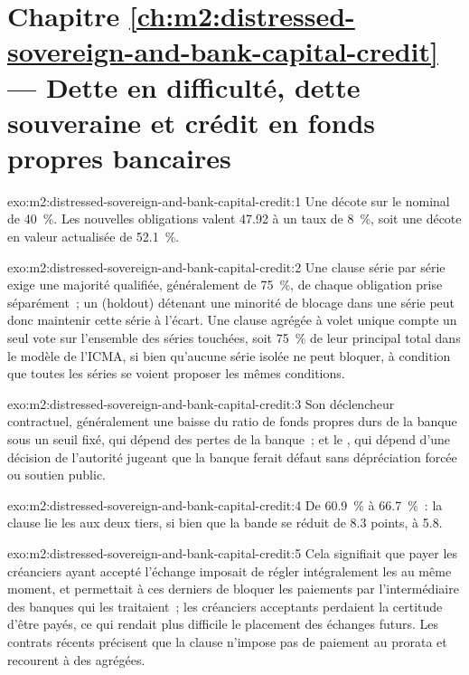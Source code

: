 \section*{Chapitre \ref{ch:m2:distressed-sovereign-and-bank-capital-credit} --- Dette en difficulté, dette souveraine et crédit en fonds propres bancaires}

\begin{solution}{exo:m2:distressed-sovereign-and-bank-capital-credit:1}
Une décote sur le nominal de 40~\%. Les nouvelles obligations valent 47.92 à un taux de 8~\%, soit une
décote en valeur actualisée de 52.1~\%.
\end{solution}

\begin{solution}{exo:m2:distressed-sovereign-and-bank-capital-credit:2}
Une clause série par série exige une majorité qualifiée, généralement de 75~\%, de chaque
obligation prise séparément~; un  (holdout) détenant une minorité de blocage dans une série peut donc maintenir cette série à l'écart.
Une clause agrégée à volet unique compte un seul vote sur l'ensemble des séries touchées, soit 75~\% de
leur principal total dans le modèle de l'ICMA, si bien qu'aucune série isolée ne peut bloquer, à condition que
toutes les séries se voient proposer les mêmes conditions.
\end{solution}

\begin{solution}{exo:m2:distressed-sovereign-and-bank-capital-credit:3}
Son déclencheur contractuel, généralement une baisse du ratio de fonds propres durs de la banque
sous un seuil fixé, qui dépend des pertes de la banque~; et le , qui dépend
d'une décision de l'autorité jugeant que la banque ferait défaut sans dépréciation forcée ou
soutien public.
\end{solution}

\begin{solution}{exo:m2:distressed-sovereign-and-bank-capital-credit:4}
De 60.9~\% à 66.7~\%~: la clause lie les  aux deux tiers, si bien que la bande
se réduit de 8.3 points, à 5.8.
\end{solution}

\begin{solution}{exo:m2:distressed-sovereign-and-bank-capital-credit:5}
Cela signifiait que payer les créanciers ayant accepté l'échange imposait de régler
intégralement les  au même moment, et permettait à ces derniers de bloquer
les paiements par l'intermédiaire des banques qui les traitaient~; les créanciers acceptants perdaient la certitude d'être payés, ce qui
rendait plus difficile le placement des échanges futurs. Les contrats récents précisent que la clause
n'impose pas de paiement au prorata et recourent à des  agrégées.
\end{solution}


